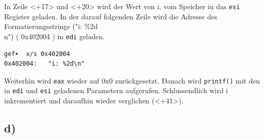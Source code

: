 \documentclass[12pt]{article}
\begin{document}
In Zeile <+17> und <+20> wird der Wert von i, vom Speicher in das \texttt{esi} Register geladen. In der darauf folgenden Zeile wird die Adresse des Formatierungsstrings ("i: \%2d\\n") ( 0x402004 ) in \texttt{edi} geladen.

\begin{lstlisting}
gef➤  x/s 0x402004
0x402004:	"i: %2d\n"
\end{lstlisting}

Weiterhin wird \texttt{eax} wieder auf 0x0 zurückgesetzt. Danach wird \texttt{printf()} mit den in \texttt{edi} und \texttt{esi} geladenen Parametern aufgerufen. Schlussendlich wird i inkrementiert und daraufhin wieder verglichen (<+41>).

\subsection{d)}
\end{document}
